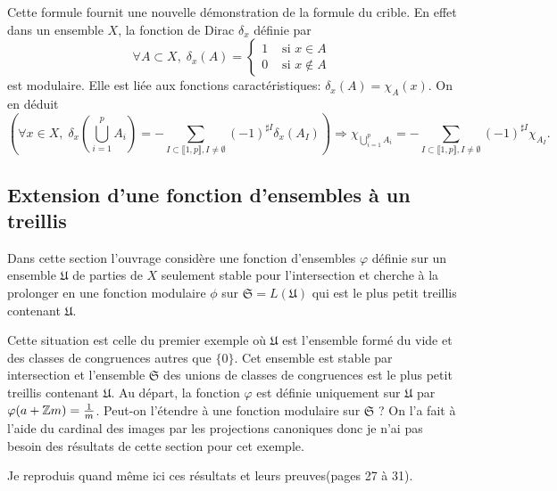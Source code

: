 \begin{rem}
  Cette formule fournit une nouvelle démonstration de la formule du crible. En effet dans un ensemble $X$, la fonction de Dirac $\delta_x$ définie par
  \begin{displaymath}
     \forall A \subset X, \;\delta_x(A) =
    \left\lbrace
    \begin{aligned}
      1 &\text{ si } x \in A \\
      0 &\text{ si } x \notin A
    \end{aligned}
    \right.
  \end{displaymath}
  est modulaire. Elle est liée aux fonctions caractéristiques: $\delta_x(A) = \chi_A(x)$. On en déduit
  \begin{displaymath}
    \left( \forall x \in X, \; \delta_x(\bigcup_{i=1}^p A_i) = - \sum_{I \subset \llbracket 1,p \rrbracket, I\neq \emptyset} (-1)^{\sharp I}\delta_x(A_I) \right)
    \Rightarrow  \chi_{\bigcup_{i=1}^p A_i} = - \sum_{I \subset \llbracket 1,p \rrbracket, I\neq \emptyset} (-1)^{\sharp I}\chi_{A_I}.
  \end{displaymath}
\end{rem}

\subsection{Extension d'une fonction d'ensembles à un treillis}
Dans cette section l'ouvrage considère une fonction d'ensembles $\varphi$ définie sur un ensemble $\mathfrak{U}$ de parties de $X$ seulement stable pour l'intersection et cherche à la prolonger en une fonction modulaire $\phi$ sur $\mathfrak{S} = L(\mathfrak{U})$ qui est le plus petit treillis contenant $\mathfrak{U}$.

Cette situation est celle du premier exemple où $\mathfrak{U}$ est l'ensemble formé du vide et des classes de congruences autres que $\{0\}$. Cet ensemble est stable par intersection et l'ensemble $\mathfrak{S}$ des unions de classes de congruences est le plus petit treillis contenant $\mathfrak{U}$.
Au départ, la fonction $\varphi$ est définie uniquement sur $\mathfrak{U}$ par  $\varphi(a + \mathbb{Z} m) = \frac{1}{m}$.
Peut-on l'étendre à une fonction modulaire sur $\mathfrak{S}$ ? On l'a fait à l'aide du cardinal des images par les projections canoniques donc je n'ai pas besoin des résultats de cette section pour cet exemple.

Je reproduis quand même ici ces résultats et leurs preuves(pages 27 à 31).

